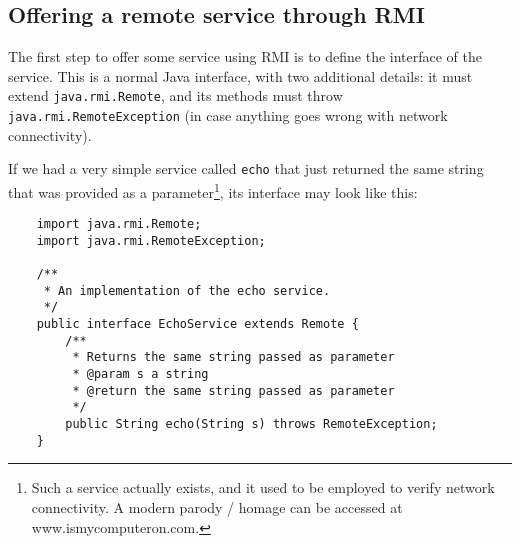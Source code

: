 





\subsection{Offering a remote service through RMI}
\label{sec:offer-remote-serv}

The first step to offer some service using RMI is to define the
interface of the service. This is a normal Java interface, with two
additional details: it must extend \verb+java.rmi.Remote+, and its
methods must throw \verb+java.rmi.RemoteException+ (in case anything
goes wrong with network connectivity). 

If we had a very simple service called \verb+echo+ that just returned
the same string that was provided as a parameter\footnote{Such a
  service actually exists, and it used to be employed to verify
  network connectivity. A modern parody / homage can be accessed at
  www.ismycomputeron.com.}, 
its interface may look like this: 

\begin{verbatim}
    import java.rmi.Remote;
    import java.rmi.RemoteException;

    /** 
     * An implementation of the echo service.
     */
    public interface EchoService extends Remote {
        /**
         * Returns the same string passed as parameter
         * @param s a string 
         * @return the same string passed as parameter
         */
        public String echo(String s) throws RemoteException;
    }
\end{verbatim}

